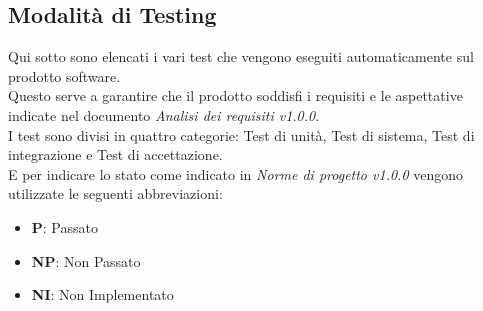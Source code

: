 \documentclass[10pt]{article}
\begin{document}
\begin{justify}

\section{Modalità di Testing}
Qui sotto sono elencati i vari test che vengono eseguiti automaticamente sul prodotto software.\\
Questo serve a garantire che il prodotto soddisfi i requisiti e le aspettative indicate nel documento \textit{Analisi dei requisiti v1.0.0}.\\
I test sono divisi in quattro categorie: Test di unità, Test di sistema, Test di integrazione e Test di accettazione.\\
E per indicare lo stato come indicato in \textit{Norme di progetto v1.0.0} vengono utilizzate le seguenti abbreviazioni:
\begin{itemize}
\item \textbf{P}: Passato
\item \textbf{NP}: Non Passato
\item \textbf{NI}: Non Implementato
\end{itemize}


\end{justify}
\end{document}
